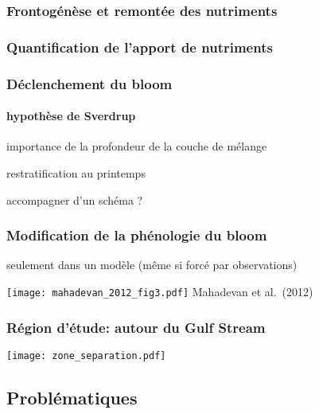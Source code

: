 
\begin{frame}
  \frametitle{Frontogénèse et remontée des nutriments}
  \centering
\end{frame}


\begin{frame}
  \frametitle{Quantification de l'apport de nutriments}



\end{frame}


\begin{frame}
  \frametitle{Déclenchement du bloom}
  \framesubtitle{hypothèse de Sverdrup}
  importance de la profondeur de la couche de mélange

  restratification au printemps

  accompagner d'un schéma ?
\end{frame}


\begin{frame}
  \frametitle{Modification de la phénologie du bloom}
  seulement dans un modèle (même si forcé par observations)

  \texttt{[image: mahadevan\_2012\_fig3.pdf]}
  Mahadevan et al.\ (2012)
\end{frame}


\begin{frame}
  \frametitle{Région d'étude: autour du Gulf Stream}


  \vfill

  \texttt{[image: zone\_separation.pdf]}
\end{frame}


\subsection{Problématiques}


